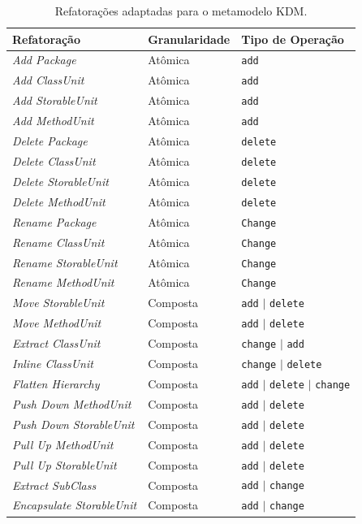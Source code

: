 \begin{table}[h]
\caption{Refatorações adaptadas para o metamodelo KDM.\label{tab:refatoringsCatalogo}}
\begin{center}
\begin{tabular}{ | m{4.5cm} | m{2.5cm} | m{4cm}| } 
\hline
Refatoração & Granularidade & Tipo de Operação\\ 
\hline
\textit{Add Package} &  Atômica & \texttt{add}\\ 
\hline
\textit{Add ClassUnit} &  Atômica & \texttt{add}\\ 
\hline
\textit{Add StorableUnit} &  Atômica & \texttt{add}\\ 
\hline
\textit{Add MethodUnit} &  Atômica & \texttt{add}\\ 
\hline
\textit{Delete Package} &  Atômica & \texttt{delete}\\ 
\hline
\textit{Delete ClassUnit} &  Atômica & \texttt{delete}\\ 
\hline
\textit{Delete StorableUnit} &  Atômica & \texttt{delete}\\ 
\hline
\textit{Delete MethodUnit} &  Atômica & \texttt{delete}\\ 
\hline
\textit{Rename Package} &  Atômica & \texttt{Change}\\ 
\hline
\textit{Rename ClassUnit} &  Atômica & \texttt{Change}\\ 
\hline
\textit{Rename StorableUnit} &  Atômica & \texttt{Change}\\ 
\hline
\textit{Rename MethodUnit} &  Atômica & \texttt{Change}\\ 
\hline
\textit{Move StorableUnit} &  Composta & \texttt{add} $|$ \texttt{delete}\\ 
\hline
\textit{Move MethodUnit} &  Composta & \texttt{add} $|$ \texttt{delete}\\ 
\hline
\textit{Extract ClassUnit} &  Composta & \texttt{change} $|$ \texttt{add}\\ 
\hline
\textit{Inline ClassUnit} &  Composta & \texttt{change} $|$ \texttt{delete}\\ 
\hline
\textit{Flatten Hierarchy} &  Composta & \texttt{add} $|$ \texttt{delete} $|$ \texttt{change}\\ 
\hline
\textit{Push Down MethodUnit} &  Composta & \texttt{add} $|$ \texttt{delete}\\ 
\hline
\textit{Push Down StorableUnit} &  Composta & \texttt{add} $|$ \texttt{delete}\\ 
\hline
\textit{Pull Up MethodUnit} &  Composta & \texttt{add} $|$ \texttt{delete}\\
\hline
\textit{Pull Up StorableUnit} &  Composta & \texttt{add} $|$ \texttt{delete}\\
\hline
\textit{Extract SubClass} &  Composta & \texttt{add} $|$ \texttt{change}\\
\hline
\textit{Encapsulate StorableUnit} &  Composta & \texttt{add} $|$ \texttt{change}\\
\hline
\end{tabular}
\end{center}
\end{table}



